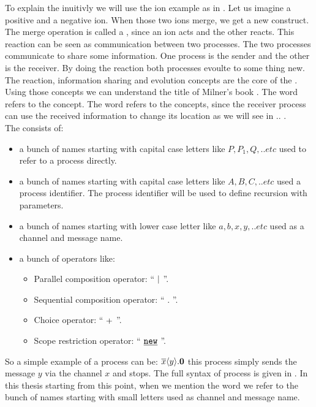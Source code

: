 To explain the \picalc{} inuitivly we will use the ion example as in \cite{milner}. Let us imagine a positive and a negative ion. When those two ions merge, we get a new construct. The merge operation is called a , since an ion acts and the other reacts. This reaction can be seen as communication between two processes. The two processes communicate to share some information.  One process is the sender and the other is the receiver. By doing the reaction both processes evoulte to some thing new. The reaction, information sharing and evolution concepts are the core of the \picalc{}. Using those concepts we can understand the title of Milner's book  \picalc{} \cite{milner}. The word  refers to the  concept. The word  refers to the  concepts, since the receiver process can use the received information to change its location as we will see in .. .
\\The \picalc{} consists of: 
\begin{itemize}
\item a bunch of names starting with capital case letters  like $P, P_1, Q,..etc$  used to refer to a process directly.
\item a bunch of names starting with capital case letters  like $A, B, C,..etc$  used a process identifier. The process identifier will be used to define recursion with parameters.
\item a bunch of names starting with lower case letter like $a, b, x, y,..etc$  used as a channel and message name.
\item a bunch of operators like:
	\begin{itemize}
	\item  Parallel composition operator: `` $\mid$ ''.
	\item  Sequential composition operator: `` $.$ ''.
	\item  Choice operator: `` $+$ ''.
	\item  Scope restriction operator: `` $\procres{}{}$ ''.
	\end{itemize}
\end{itemize}
So a simple example of a process can be: $\overline{x}\langle y\rangle.\mathbf{0}$ this process simply sends the message $y$ via the channel $x$ and stops.
The full syntax of \picalc{} process is given in . In this thesis starting from this point, when we mention the word  we refer to the bunch of names starting with small letters used as channel and message name.

